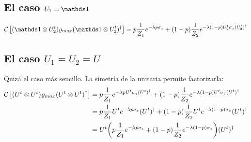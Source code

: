\subsection{El caso $U_{1}=\Id$}
\begin{equation}\label{eq:SeparableDynamicsIxU}
\CG{(\Id\otimes U_{2}^{t} )\varrho_{max}(\Id\otimes U_{2}^{t})^{\dag}}=p\frac{1}{Z_{1}}e^{-\lambda p \sigma_{z}}+(1-p)\frac{1}{Z_{2}}e^{-\lambda (1-p)U_{2}^{t}\sigma_{z}(U_{2}^t)^{\dag}}
\end{equation}
\subsection{El caso $U_{1}=U_{2}=U$}
Quizá el caso más sencillo. La simetría de la unitaria permite factorizarla:
\begin{align*}
\mathcal{C}\left[(U^{t}\otimes U^{t})\varrho_{max}(U^{t}\otimes U^{t})^{\dag}\right]&=p\frac{1}{Z_{1}}e^{-\lambda p U^{t}\sigma_{z}(U^t)^{\dag}}+(1-p)\frac{1}{Z_{2}}e^{-\lambda (1-p)U^{t}\sigma_{z}(U^t)^{\dag}}\\
&=p\frac{1}{Z_{1}}U^{t}e^{-\lambda p \sigma_{z}}(U^t)^{\dag}+(1-p)\frac{1}{Z_{2}}U^{t}e^{-\lambda (1-p)\sigma_{z}}(U^t)^{\dag}\\
&=U^{t}\qty(p\frac{1}{Z_{1}}e^{-\lambda p \sigma_{z}}+(1-p)\frac{1}{Z_{2}}e^{-\lambda (1-p)\sigma_{z}})(U^t)^{\dag}\\
\end{align*}